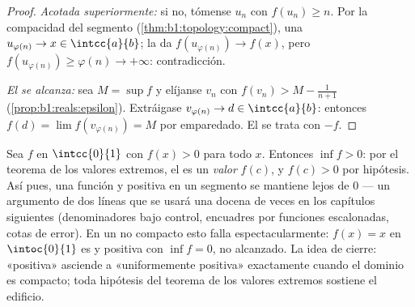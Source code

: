 \begin{proof}
\emph{Acotada superiormente:} si no, tómense $u_n$ con
$f(u_n) \geq n$. Por la compacidad del segmento
(\cref{thm:b1:topology:compact}), una 
$u_{\varphi(n)} \to x \in \intcc{a}{b}$; la  da
$f(u_{\varphi(n)}) \to f(x)$, pero
$f(u_{\varphi(n)}) \geq \varphi(n) \to +\infty$: contradicción.

\emph{El  se alcanza:} sea $M = \sup f$ y elíjanse $v_n$ con
$f(v_n) > M - \frac{1}{n+1}$ (\cref{prop:b1:reals:epsilon}).
Extráigase $v_{\varphi(n)} \to d \in \intcc{a}{b}$: entonces
$f(d) = \lim f(v_{\varphi(n)}) = M$ por emparedado. El  se
trata con $-f$.
\end{proof}

\begin{example}\label{ex:b1:continuity:posmin}
Sea $f$  en $\intcc{0}{1}$ con $f(x) > 0$ para todo $x$.
Entonces $\inf f > 0$: por el teorema de los valores extremos, el
 es un \emph{valor} $f(c)$, y $f(c) > 0$ por hipótesis. Así
pues, una función  y positiva en un segmento se mantiene
lejos de $0$ --- un argumento de dos líneas que se usará una docena
de veces en los capítulos siguientes (denominadores bajo control,
encuadres por funciones escalonadas, cotas de error). En un
 no compacto esto falla espectacularmente: $f(x) = x$ en
$\intoc{0}{1}$ es  y positiva con $\inf f = 0$, no alcanzado.
La idea de cierre: «positiva» asciende a «uniformemente positiva»
exactamente cuando el dominio es compacto; toda hipótesis del teorema
de los valores extremos sostiene el edificio.
\end{example}

